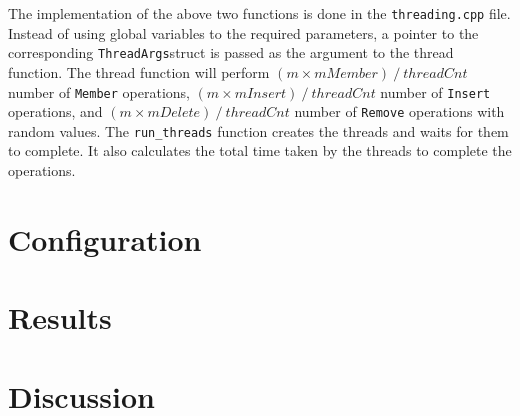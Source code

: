 \documentclass[a4paper,12pt]{article}
\begin{document}
The implementation of the above two functions is done in the \lstinline|threading.cpp| file. Instead of using global variables to the required parameters, a pointer to the corresponding \lstinline|ThreadArgs|struct is passed as the argument to the thread function. The thread function will perform \( (m \times mMember)\ /\ threadCnt \) number of \lstinline|Member| operations, \( (m \times mInsert)\ /\ threadCnt \) number of \lstinline|Insert| operations, and \( (m \times mDelete)\ /\ threadCnt \) number of \lstinline|Remove| operations with random values. The \lstinline|run_threads| function creates the threads and waits for them to complete. It also calculates the total time taken by the threads to complete the operations.

\section{Configuration}

\section{Results}

\section{Discussion}
\end{document}
